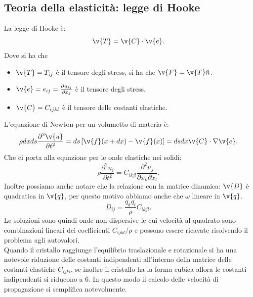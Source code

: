 \subsection{Teoria della elasticità: legge di Hooke}%
\label{sub:Teoria della elasticità: legge di Hooke}
La legge di Hooke è:
\[
\v{T}=\v{C}\cdot \v{e}
.\] 
Dove si ha che 
\begin{itemize}
    \item $\v{T}=T_{ij}$ è il tensore degli stress, si ha che $\v{F}=\v{T}\hat{n}$.
    \item $\v{e}=e_{ij}=\frac{\partial u_{ij}}{\partial x_j}$ è il tensore degli stress.
    \item $\v{C}=C_{ijkl}$ è il tensore delle costanti elastiche.
\end{itemize}
L'equazione di Newton per un volumetto di materia è:
\[
    \rho dxds\frac{\partial ^2\v{u}}{\partial t^2} = ds\left[\v{f}(x+dx) - \v{f}(x) \right] = dsdx \v{C}\cdot \nabla \v{e} 
.\] 
Che ci porta alla equazione per le onde elastiche nei solidi:
\[
    \rho\frac{\partial ^2 u_i }{\partial t^2}= C_{ikjl}\frac{\partial ^2 u_j}{\partial x_k \partial x_l}  
.\] 
Inoltre possiamo anche notare che la relazione con la matrice dinamica: $\v{D}$ è quadratica in $\v{q}$, per questo motivo abbiamo anche che $\omega$ lineare in $\v{q}$.
\[
D_{ij}= \frac{q_k q_l}{\rho}C_{ikjl}
.\] 
Le soluzioni sono quindi onde non dispersive le cui velocità al quadrato sono combinazioni lineari dei coefficienti $C_{ijkl} /\rho$ e possono essere ricavate risolvendo il problema agli autovalori.\\
Quando il cristallo raggiunge l'equilibrio traslazionale e rotazionale si ha una notevole riduzione delle costanti indipendenti all'interno della matrice delle costanti elastiche $C_{ijkl}$, se inoltre il cristallo ha la forma cubica allora le costanti indipendenti si riducono a 6. In questo modo il calcolo delle velocità di propagazione si semplifica notevolmente.

